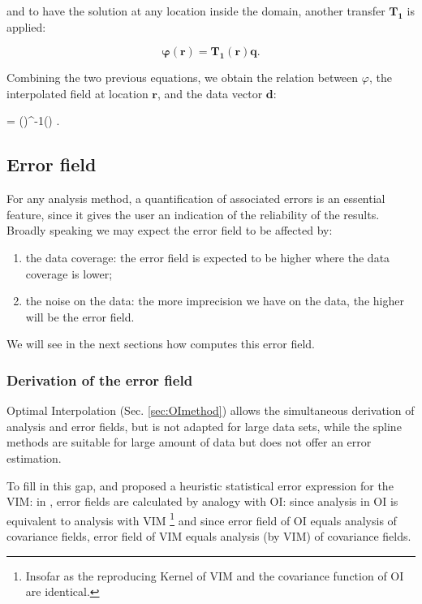 and to have the solution at any location inside the domain, another transfer $\mathbf{T_{1}}$ is applied:

\[\boldsymbol{\varphi}(\mathbf{r})=\mathbf{T_1}(\mathbf{r})\mathbf{q}.\]

Combining the two previous equations, we obtain the relation between $\varphi$, the interpolated field at location $\mathbf{r}$,  and the data vector $\mathbf{d}$:

\be
\boldsymbol{\varphi} = ()^{-1}() .
\label{eq:solution2}
\ee


\subsection{Error field}

For any analysis method, a quantification of associated errors is an essential feature, since it gives the user an indication of the reliability of the results. Broadly speaking we may expect the error field to be affected by:
\begin{enumerate}
\item the data coverage: the error field is expected to be higher where the data coverage is lower;
\item the noise on the data: the more imprecision we have on the data, the higher will be the error field.
\end{enumerate}

We will see in the next sections how \diva computes this error field.

\subsubsection{Derivation of the error field}

Optimal Interpolation (Sec. \ref{sec:OImethod}) allows the simultaneous derivation of analysis and error fields, but is not adapted for large data sets, while the spline methods are suitable for large amount of data but does not offer an error estimation.

To fill in this gap, \cite{BRANKART98} and \cite{RIXEN00} proposed a heuristic statistical error expression for the VIM: in \diva, error fields are calculated by analogy with OI: since analysis in OI is equivalent to analysis with VIM \footnote{Insofar as the reproducing Kernel of VIM and the covariance function of OI are identical.} and 
since error field of OI equals analysis of covariance fields, error field of VIM equals analysis (by VIM) of covariance fields.

